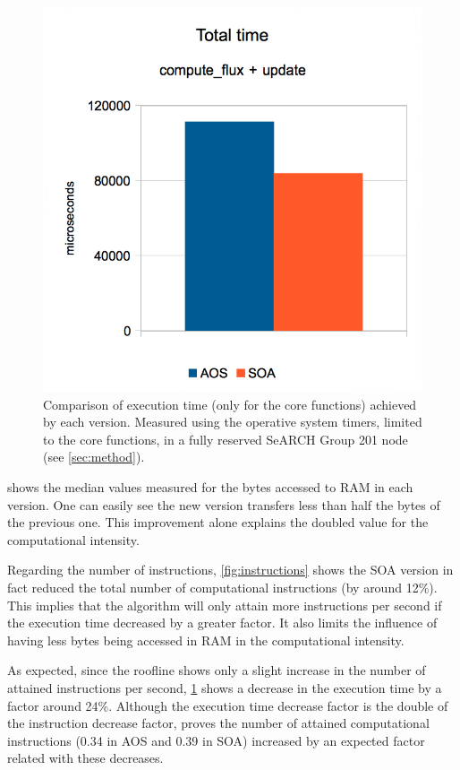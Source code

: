 \documentclass[abstract=on,9pt,twocolumn]{scrartcl}
\begin{document}
\begin{figure}[!p]
	\begin{center}
		\includegraphics[width=\columnwidth]{images/report.april/time.png}
	\end{center}
	\caption{Comparison of execution time (only for the core functions) achieved by each version. Measured using the operative system timers, limited to the core functions, in a fully reserved SeARCH Group 201 node (see \cref{sec:method}).}
	\label{fig:time}
\end{figure}

 shows the median values measured for the bytes accessed to RAM in each version. One can easily see the new version transfers less than half the bytes of the previous one. This improvement alone explains the doubled value for the computational intensity.

Regarding the number of instructions, \cref{fig:instructions} shows the SOA version in fact reduced the total number of computational instructions (by around 12\%). This implies that the algorithm will only attain more instructions per second if the execution time decreased by a greater factor. It also limits the influence of having less bytes being accessed in RAM in the computational intensity.

As expected, since the roofline shows only a slight increase in the number of attained instructions per second, \cref{fig:time} shows a decrease in the execution time by a factor around 24\%. Although the execution time decrease factor is the double of the instruction decrease factor,  proves the number of attained computational instructions (0.34 in AOS and 0.39 in SOA) increased by an expected factor related with these decreases.
\end{document}
